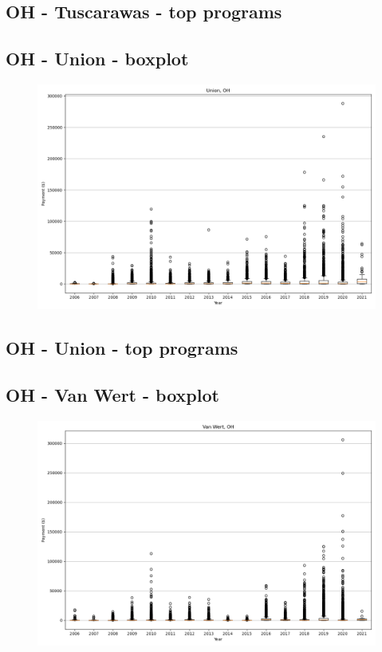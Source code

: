\subsection*{OH - Tuscarawas - top programs}

\newpage
\subsection*{OH - Union - boxplot}
\begin{figure}[h]
\centering
\includegraphics[width=7in]{../output/boxplots/counties/Union-OH_boxplot.png}
\end{figure}


\subsection*{OH - Union - top programs}

\newpage
\subsection*{OH - Van Wert - boxplot}
\begin{figure}[h]
\centering
\includegraphics[width=7in]{../output/boxplots/counties/Van Wert-OH_boxplot.png}
\end{figure}


